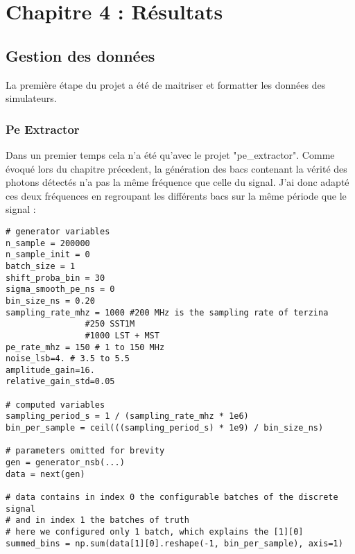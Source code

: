 \chapter{Chapitre 4 : Résultats}





\section{Gestion des données}
La première étape du projet a été de maitriser et formatter les données des simulateurs. 

\subsection{Pe Extractor}
Dans un premier temps cela n'a été qu'avec le projet "pe\_extractor".
Comme évoqué lors du chapitre précedent, la génération des bacs contenant la vérité des photons détectés n'a pas la même fréquence que celle du signal.
J'ai donc adapté ces deux fréquences en regroupant les différents bacs sur la même période que le signal :

\begin{lstlisting}[language=iPython,caption={Regroupement des bacs de photons insérés, signal\_sense.ipynb},captionpos=b]
# generator variables
n_sample = 200000
n_sample_init = 0
batch_size = 1
shift_proba_bin = 30
sigma_smooth_pe_ns = 0
bin_size_ns = 0.20
sampling_rate_mhz = 1000 #200 MHz is the sampling rate of terzina
				#250 SST1M
				#1000 LST + MST
pe_rate_mhz = 150 # 1 to 150 MHz
noise_lsb=4. # 3.5 to 5.5
amplitude_gain=16.
relative_gain_std=0.05

# computed variables
sampling_period_s = 1 / (sampling_rate_mhz * 1e6)
bin_per_sample = ceil(((sampling_period_s) * 1e9) / bin_size_ns)

# parameters omitted for brevity
gen = generator_nsb(...)
data = next(gen)

# data contains in index 0 the configurable batches of the discrete signal
# and in index 1 the batches of truth
# here we configured only 1 batch, which explains the [1][0]
summed_bins = np.sum(data[1][0].reshape(-1, bin_per_sample), axis=1)
\end{lstlisting}

